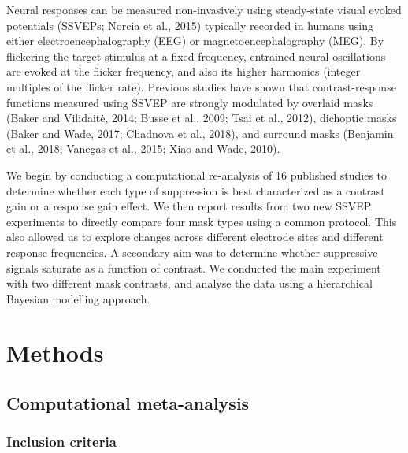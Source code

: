 \documentclass[]{article}
\begin{document}
Neural responses can be measured non-invasively using steady-state visual evoked potentials (SSVEPs; Norcia et al., 2015) typically recorded in humans using either electroencephalography (EEG) or magnetoencephalography (MEG). By flickering the target stimulus at a fixed frequency, entrained neural oscillations are evoked at the flicker frequency, and also its higher harmonics (integer multiples of the flicker rate). Previous studies have shown that contrast-response functions measured using SSVEP are strongly modulated by overlaid masks (Baker and Vilidaitė, 2014; Busse et al., 2009; Tsai et al., 2012), dichoptic masks (Baker and Wade, 2017; Chadnova et al., 2018), and surround masks (Benjamin et al., 2018; Vanegas et al., 2015; Xiao and Wade, 2010).

We begin by conducting a computational re-analysis of 16 published studies to determine whether each type of suppression is best characterized as a contrast gain or a response gain effect. We then report results from two new SSVEP experiments to directly compare four mask types using a common protocol. This also allowed us to explore changes across different electrode sites and different response frequencies. A secondary aim was to determine whether suppressive signals saturate as a function of contrast. We conducted the main experiment with two different mask contrasts, and analyse the data using a hierarchical Bayesian modelling approach.

\hypertarget{methods}{%
\section{Methods}\label{methods}}

\hypertarget{computational-meta-analysis}{%
\subsection{Computational meta-analysis}\label{computational-meta-analysis}}

\hypertarget{inclusion-criteria}{%
\subsubsection{Inclusion criteria}\label{inclusion-criteria}}
\end{document}
